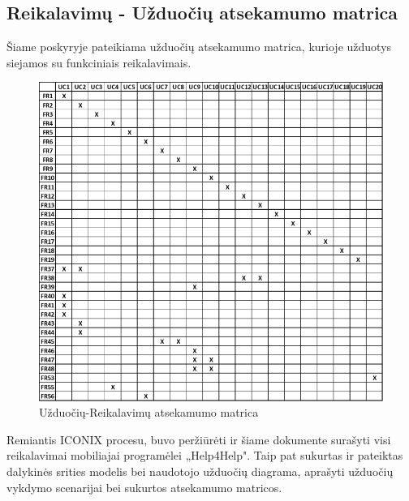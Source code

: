\documentclass{VUMIFPSbakalaurinis}
\begin{document}
\subsection{Reikalavimų - Užduočių atsekamumo matrica}
Šiame poskyryje pateikiama užduočių atsekamumo matrica, kurioje užduotys siejamos su funkciniais reikalavimais.
\begin{figure}[H]
    \centering
    \includegraphics[scale=0.8]{img/UC-matrix}
    \caption{Užduočių-Reikalavimų atsekamumo matrica}
    \label{img:uc-matrix}
\end{figure}

Remiantis ICONIX procesu, buvo peržiūrėti ir šiame dokumente surašyti visi reikalavimai mobiliajai programėlei „Help4Help". Taip pat sukurtas ir pateiktas dalykinės srities modelis bei naudotojo užduočių diagrama, aprašyti užduočių vykdymo scenarijai bei sukurtos atsekamumo matricos.

\printbibliography[heading=bibintoc]  %
\end{document}
